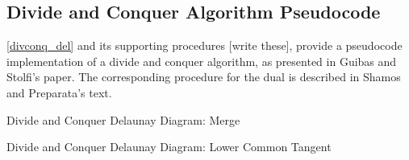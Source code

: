 \documentclass[12pt,twoside]{reedthesis}
\makeatletter
\let\OldStatex\Statex
\renewcommand{\Statex}[1][3]{%
  \setlength\@tempdima{\algorithmicindent}%
  \OldStatex\hskip\dimexpr#1\@tempdima\relax}
\makeatother
\begin{document}


  \subsection{Divide and Conquer Algorithm Pseudocode} %
  \label{sub:divide_and_conquer_algorithm_pseudocode}
  \cref{divconq_del} and its supporting procedures [write these], provide a pseudocode implementation of a divide and conquer algorithm, as presented in Guibas and Stolfi's paper. The corresponding procedure for the dual is described in Shamos and Preparata's text. 
  
  \begin{algorithm}[H]
  \end{algorithm}

  \begin{algorithm}[H]
  \begin{algorithmic}[1]
  \caption{Divide and Conquer Delaunay Diagram: Merge}\label{del_merge}
  \EndProcedure
  \end{algorithmic} 
  \end{algorithm}

  \begin{algorithm}[H]
  \begin{algorithmic}[1]
  \caption{Divide and Conquer Delaunay Diagram: Lower Common Tangent}\label{del_lct}
  \EndProcedure
  \end{algorithmic} 
  \end{algorithm}
  
\end{document}
